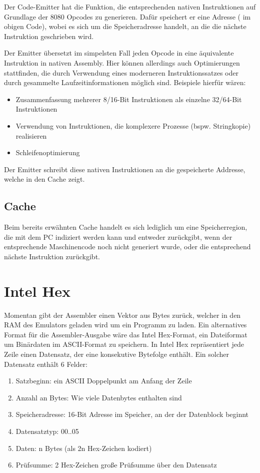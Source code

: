 Der Code-Emitter hat die Funktion, die entsprechenden nativen Instruktionen auf Grundlage der 8080 Opcodes zu generieren. Dafür speichert er eine Adresse ( im obigen Code), wobei es sich um die Speicheradresse handelt, an die die nächste Instruktion geschrieben wird.

Der Emitter übersetzt im simpelsten Fall jeden Opcode in eine äquivalente Instruktion in nativen Assembly. Hier können allerdings auch Optimierungen stattfinden, die durch Verwendung eines moderneren Instruktionssatzes oder durch gesammelte Laufzeitinformationen möglich sind. Beispiele hierfür wären:

\begin{itemize}
    \item Zusammenfassung mehrerer 8/16-Bit Instruktionen als einzelne 32/64-Bit Instruktionen
    \item Verwendung von Instruktionen, die komplexere Prozesse (bspw. Stringkopie) realisieren
    \item Schleifenoptimierung
\end{itemize}

Der Emitter schreibt diese nativen Instruktionen an die gespeicherte Addresse, welche in den Cache zeigt.

\subsection{Cache}

Beim bereits erwähnten Cache handelt es sich lediglich um eine Speicherregion, die mit dem PC indiziert werden kann und entweder  zurückgibt, wenn der entsprechende Maschinencode noch nicht generiert wurde, oder die entsprechend nächste Instruktion zurückgibt.


\section{Intel Hex}

Momentan gibt der Assembler einen Vektor aus Bytes zurück, welcher in den RAM des Emulators geladen wird um ein Programm zu laden. Ein alternatives Format für die Assembler-Ausgabe wäre das Intel Hex-Format, ein Dateiformat um Binärdaten im ASCII-Format zu speichern. In Intel Hex repräsentiert jede Zeile einen Datensatz, der eine konsekutive Bytefolge enthält. Ein solcher Datensatz enthält 6 Felder:

\begin{enumerate}
\item Satzbeginn: ein ASCII Doppelpunkt am Anfang der Zeile
\item Anzahl an Bytes: Wie viele Datenbytes enthalten sind
\item Speicheradresse: 16-Bit Adresse im Speicher, an der der Datenblock beginnt
\item Datensatztyp: 00..05
\item Daten: n Bytes (als 2n Hex-Zeichen kodiert)
\item Prüfsumme: 2 Hex-Zeichen große Prüfsumme über den Datensatz
\end{enumerate}

